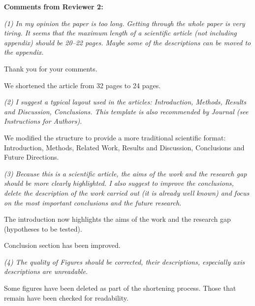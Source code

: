 \documentclass[12pt]{letter}
\begin{document}
\begin{letter}{}

{\bf Comments from Reviewer 2:}

{\em (1) In my opinion the paper is too long. Getting through the whole paper is very tiring. It seems that the maximum length of a scientific article (not including appendix) should be 20–22 pages. Maybe some of the descriptions can be moved to the appendix.}

Thank you for your comments.

We shortened the article from 32 pages to 24 pages.

{\em (2) I suggest a typical layout used in the articles: Introduction, Methods, Results and Discussion, Conclusions. This template is also recommended by Journal (see Instructions for Authors).}

We modified the structure to provide a more traditional scientific format: Introduction, Methods, Related Work, Results and Discussion, Conclusions and Future Directions.

{\em (3) Because this is a scientific article, the aims of the work and the research gap should be more clearly highlighted. I also suggest to improve the conclusions, delete the description of the work carried out (it is already well known) and focus on the most important conclusions and the future research. }

The introduction now highlights the aims of the work and the research gap (hypotheses to be tested).

Conclusion section has been improved.

{\em (4) The quality of Figures should be corrected, their descriptions, especially axis descriptions are unreadable.}

Some figures have been deleted as part of the shortening process. Those that remain have been checked for readability.

\end{letter}
\end{document}
